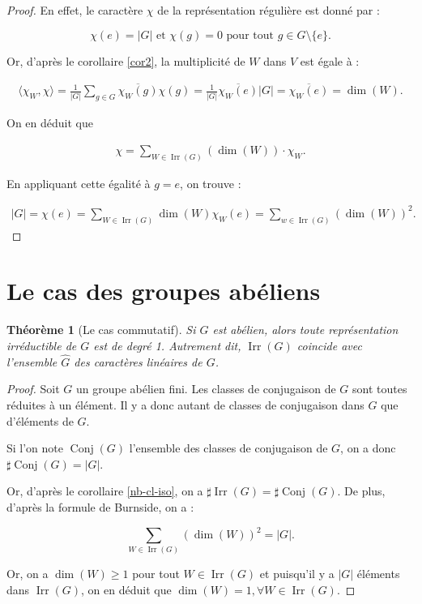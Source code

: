 \documentclass[french]{book}
\newtheorem{prototheorem}{Théorème}[section]
\newenvironment{thm}
   {\colorlet{shadecolor}{orange!10}\begin{shaded}\begin{prototheorem}}
   {\end{prototheorem}\end{shaded}}
\theoremstyle{definition}
\theoremstyle{remark}
\begin{document}
\begin{proof}
  En effet, le caractère \(\chi\) de la représentation régulière est donné par :

  \[\chi(e) = \left\lvert G \right\rvert \text{ et } \chi(g) = 0 \text{ pour tout } g \in G \setminus \{ e \}.\]

  Or, d'après le corollaire \ref{cor2}, la multiplicité de \(W\) dans \(V\) est égale à :

  \begin{gather*}
    \langle \chi_W, \chi \rangle = \frac{1}{\left\lvert G \right\rvert} \sum_{g \in G} \overline{\chi_W(g)} \chi(g) =  \frac{1}{\left\lvert G \right\rvert} \overline{\chi_W(e)} \left\lvert G \right\rvert = \overline{\chi_W(e)} = \operatorname{dim}(W).
  \end{gather*}

  On en déduit que

  \begin{gather*}
    \chi = \sum_{W \in \operatorname{Irr}(G)}(\operatorname{dim}(W)) \cdot \chi_W.
  \end{gather*}

  En appliquant cette égalité à \(g = e\), on trouve :

  \begin{gather*}
    \left\lvert G \right\rvert = \chi(e) = \sum_{W \in \operatorname{Irr}(G)}^{} \operatorname{dim}(W) \chi_W(e) = \sum_{w \in \operatorname{Irr}(G)}^{} (\operatorname{dim}(W))^2.
  \end{gather*}
\end{proof}

\section{Le cas des groupes abéliens}

\begin{thm}[Le cas commutatif]
  Si \(G\) est abélien, alors toute représentation irréductible de \(G\) est de degré 1. Autrement dit, \(\operatorname{Irr}(G)\) coincide avec l'ensemble \(\hat{G}\) des caractères linéaires de \(G\).
\end{thm}

\begin{proof}
  Soit \(G\) un groupe abélien fini. Les classes de conjugaison de \(G\) sont toutes réduites à un élément. Il y a donc autant de classes de conjugaison dans \(G\) que d'éléments de \(G\).

  Si l'on note \(\operatorname{Conj}(G)\) l'ensemble des classes de conjugaison de \(G\), on a donc \(\sharp \operatorname{Conj}(G) = \left\lvert G \right\rvert\).

  Or, d'après le corollaire \ref{nb-cl-iso}, on a \(\sharp \operatorname{Irr}(G)= \sharp \operatorname{Conj}(G)\). De plus, d'après la formule de Burnside, on a :

  \[\sum_{W \in \operatorname{Irr}(G)} (\operatorname{dim}(W))^2 = \left\lvert G \right\rvert. \]

  Or, on a \(\operatorname{dim}(W) \geq 1\) pour tout \(W \in \operatorname{Irr}(G)\) et puisqu'il y a \(\left\lvert G \right\rvert\) éléments dans \(\operatorname{Irr}(G)\), on en déduit que \(\operatorname{dim}(W) = 1, \forall W \in \operatorname{Irr}(G)\).
\end{proof}
\end{document}
